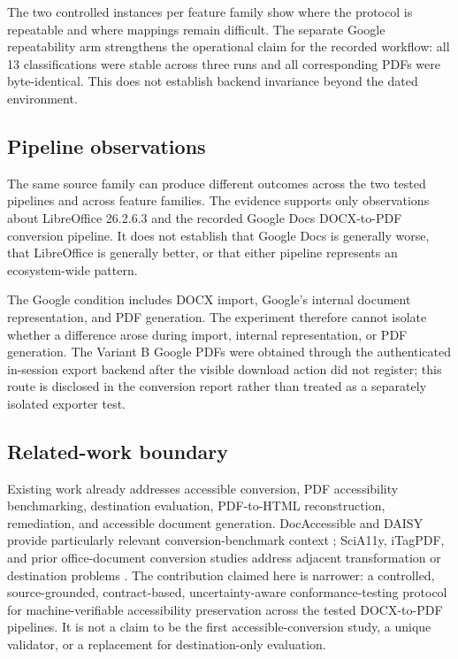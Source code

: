 The two controlled instances per feature family show where the protocol is repeatable and where mappings remain difficult. The separate Google repeatability arm strengthens the operational claim for the recorded workflow: all 13 classifications were stable across three runs and all corresponding PDFs were byte-identical. This does not establish backend invariance beyond the dated environment.

\subsection{Pipeline observations}

The same source family can produce different outcomes across the two tested pipelines and across feature families. The evidence supports only observations about LibreOffice 26.2.6.3 and the recorded Google Docs DOCX-to-PDF conversion pipeline. It does not establish that Google Docs is generally worse, that LibreOffice is generally better, or that either pipeline represents an ecosystem-wide pattern.

The Google condition includes DOCX import, Google's internal document representation, and PDF generation. The experiment therefore cannot isolate whether a difference arose during import, internal representation, or PDF generation. The Variant B Google PDFs were obtained through the authenticated in-session export backend after the visible download action did not register; this route is disclosed in the conversion report rather than treated as a separately isolated exporter test.

\subsection{Related-work boundary}

Existing work already addresses accessible conversion, PDF accessibility benchmarking, destination evaluation, PDF-to-HTML reconstruction, remediation, and accessible document generation. DocAccessible and DAISY provide particularly relevant conversion-benchmark context \cite{docaccessible2026,daisy2026}; SciA11y, iTagPDF, and prior office-document conversion studies address adjacent transformation or destination problems \cite{wang2021scia11y,mowar2026,roig2015}. The contribution claimed here is narrower: a controlled, source-grounded, contract-based, uncertainty-aware conformance-testing protocol for machine-verifiable accessibility preservation across the tested DOCX-to-PDF pipelines. It is not a claim to be the first accessible-conversion study, a unique validator, or a replacement for destination-only evaluation.

